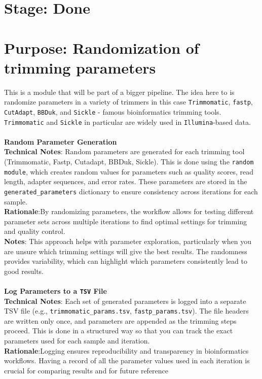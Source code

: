 \documentclass[11pt]{report}
\begin{document}
\section*{Stage: Done}   
\section*{Purpose: Randomization of trimming parameters}

This is a module that will be part of a bigger pipeline. The idea here to is randomize parameters in a variety of trimmers in this case \texttt{Trimmomatic},
\texttt{fastp}, \texttt{CutAdapt}, \texttt{BBDuk}, and \texttt{Sickle} - famous bioinformatics trimming tools. \texttt{Trimmomatic} and \texttt{Sickle} in particular are widely used in \texttt{Illumina}-based data.\\ 
\\
\textbf{Random Parameter Generation}
\\ \textbf{Technical Notes}: Random parameters are generated for each trimming tool (Trimmomatic, Fastp, Cutadapt, BBDuk, Sickle). This is done using the \texttt{random module}, which creates random values for parameters such as quality scores, read length, adapter sequences, and error rates. These parameters are stored in the \texttt{generated\_parameters} dictionary to ensure consistency across iterations for each sample.\\
\textbf{Rationale}:By randomizing parameters, the workflow allows for testing different parameter sets across multiple iterations to find optimal settings for trimming and quality control.
\\ \textbf{Notes}: This approach helps with parameter exploration, particularly when you are unsure which trimming settings will give the best results. The randomness provides variability, which can highlight which parameters consistently lead to good results.
  \\
\\ 
\textbf{Log Parameters to a \texttt{TSV} File}
\\ \textbf{Technical Notes}: Each set of generated parameters is logged into a separate TSV file (e.g., \texttt{trimmomatic\_params.tsv}, \texttt{fastp\_params.tsv}). The file headers are written only once, and parameters are appended as the trimming steps proceed. This is done in a structured way so that you can track the exact parameters used for each sample and iteration.\\
\textbf{Rationale}:Logging ensures reproducibility and transparency in bioinformatics workflows. Having a record of all the parameter values used in each iteration is crucial for comparing results and for future reference
\end{document}
